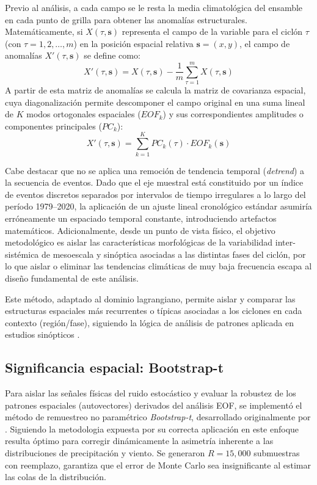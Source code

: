 Previo al análisis, a cada campo se le resta la media climatológica del ensamble en cada punto de grilla para obtener las anomalías estructurales. Matemáticamente, si $X(\tau, \mathbf{s})$ representa el campo de la variable para el ciclón $\tau$ (con $\tau = 1, 2, \dots, m$) en la posición espacial relativa $\mathbf{s} = (x, y)$, el campo de anomalías $X'(\tau, \mathbf{s})$ se define como:
\begin{equation}
    X'(\tau, \mathbf{s}) = X(\tau, \mathbf{s}) - \frac{1}{m}\sum_{\tau=1}^{m}X(\tau, \mathbf{s})
\end{equation}
A partir de esta matriz de anomalías se calcula la matriz de covarianza espacial, cuya diagonalización permite descomponer el campo original en una suma lineal de $K$ modos ortogonales espaciales ($EOF_k$) y sus correspondientes amplitudes o componentes principales ($PC_k$):
\begin{equation}
    X'(\tau, \mathbf{s}) = \sum_{k=1}^{K} PC_k(\tau) \cdot EOF_k(\mathbf{s})
\end{equation}

Cabe destacar que no se aplica una remoción de tendencia temporal (\textit{detrend}) a la secuencia de eventos. Dado que el eje muestral está constituido por un índice de eventos discretos separados por intervalos de tiempo irregulares a lo largo del período 1979--2020, la aplicación de un ajuste lineal cronológico estándar asumiría erróneamente un espaciado temporal constante, introduciendo artefactos matemáticos. Adicionalmente, desde un punto de vista físico, el objetivo metodológico es aislar las características morfológicas de la variabilidad inter-sistémica de mesoescala y sinóptica asociadas a las distintas fases del ciclón, por lo que aislar o eliminar las tendencias climáticas de muy baja frecuencia escapa al diseño fundamental de este análisis.

Este método, adaptado al dominio lagrangiano, permite aislar y comparar las estructuras espaciales más recurrentes o típicas asociadas a los ciclones en cada contexto (región/fase), siguiendo la lógica de análisis de patrones aplicada en estudios sinópticos \citep{vera2002cold}.
\subsection{Significancia espacial: Bootstrap-t}\label{subsec:bootstrap_significancia}

Para aislar las señales físicas del ruido estocástico y evaluar la robustez de los patrones espaciales (autovectores) derivados del análisis EOF, se implementó el método de remuestreo no paramétrico \textit{Bootstrap-t}, desarrollado originalmente por \citet{efron1993introduction}. Siguiendo la metodologia expuesta por \citet{hesterberg2015bootstrap} su correcta aplicación en este enfoque resulta óptimo para corregir dinámicamente la asimetría inherente a las distribuciones de precipitación y viento. Se generaron $R = 15,000$ submuestras con reemplazo, garantiza que el error de Monte Carlo sea insignificante al estimar las colas de la distribución.

